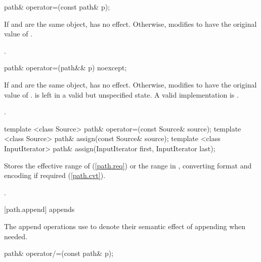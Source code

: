 \begin{itemdecl}
path& operator=(const path& p);
\end{itemdecl}

\begin{itemdescr}
\pnum
\effects If  and  are the same
object, has no effect. Otherwise, modifies  to have the
original value of .

\pnum
\returns {}.
\end{itemdescr}

\begin{itemdecl}
path& operator=(path&& p) noexcept;
\end{itemdecl}

\begin{itemdescr}
\pnum
\effects If  and  are the same
object, has no effect. Otherwise, modifies  to have the
original value of .  is left in a
valid but unspecified state.
\enternote A valid implementation is . \exitnote

\pnum
\returns {}.
\end{itemdescr}

\begin{itemdecl}
template <class Source>
  path& operator=(const Source& source);
template <class Source>
  path& assign(const Source& source);
template <class InputIterator>
  path& assign(InputIterator first, InputIterator last);
\end{itemdecl}

\begin{itemdescr}
\pnum
\effects Stores the effective range of  (\ref{path.req})
or the range  in ,
converting format and encoding if required (\ref{path.cvt}).

\pnum
\returns {}.
\end{itemdescr}

[path.append]{ appends}

\pnum
The append operations use  to denote their semantic effect of appending
 when needed.

\begin{itemdecl}
path& operator/=(const path& p);
\end{itemdecl}

